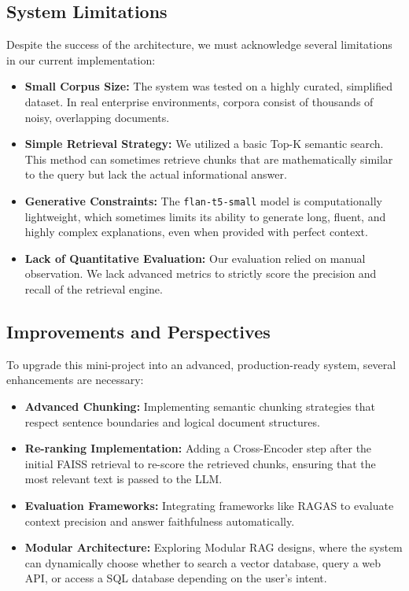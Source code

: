 \documentclass[11pt,a4paper]{article}
\begin{document}
\subsection{System Limitations}
Despite the success of the architecture, we must acknowledge several limitations in our current implementation:
\begin{itemize}
    \item \textbf{Small Corpus Size:} The system was tested on a highly curated, simplified dataset. In real enterprise environments, corpora consist of thousands of noisy, overlapping documents.
    \item \textbf{Simple Retrieval Strategy:} We utilized a basic Top-K semantic search. This method can sometimes retrieve chunks that are mathematically similar to the query but lack the actual informational answer.
    \item \textbf{Generative Constraints:} The \texttt{flan-t5-small} model is computationally lightweight, which sometimes limits its ability to generate long, fluent, and highly complex explanations, even when provided with perfect context.
    \item \textbf{Lack of Quantitative Evaluation:} Our evaluation relied on manual observation. We lack advanced metrics to strictly score the precision and recall of the retrieval engine.
\end{itemize}

\subsection{Improvements and Perspectives}
To upgrade this mini-project into an advanced, production-ready system, several enhancements are necessary:
\begin{itemize}
    \item \textbf{Advanced Chunking:} Implementing semantic chunking strategies that respect sentence boundaries and logical document structures.
    \item \textbf{Re-ranking Implementation:} Adding a Cross-Encoder step after the initial FAISS retrieval to re-score the retrieved chunks, ensuring that the most relevant text is passed to the LLM.
    \item \textbf{Evaluation Frameworks:} Integrating frameworks like RAGAS to evaluate context precision and answer faithfulness automatically.
    \item \textbf{Modular Architecture:} Exploring Modular RAG designs, where the system can dynamically choose whether to search a vector database, query a web API, or access a SQL database depending on the user's intent.
\end{itemize}
\end{document}
